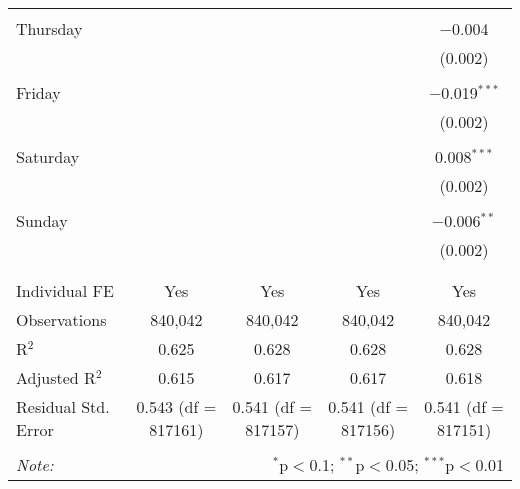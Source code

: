 \documentclass[
]{article}
\begin{document}
\begin{table}[!htbp]
{\begin{tabular}{@{\extracolsep{5pt}}lcccc}
  & & & & \\ 
 Thursday &  &  &  & $-$0.004 \\ 
  &  &  &  & (0.002) \\ 
  & & & & \\ 
 Friday &  &  &  & $-$0.019$^{***}$ \\ 
  &  &  &  & (0.002) \\ 
  & & & & \\ 
 Saturday &  &  &  & 0.008$^{***}$ \\ 
  &  &  &  & (0.002) \\ 
  & & & & \\ 
 Sunday &  &  &  & $-$0.006$^{**}$ \\ 
  &  &  &  & (0.002) \\ 
  & & & & \\ 
\hline \\[-1.8ex] 
Individual FE & Yes & Yes & Yes & Yes \\ 
Observations & 840,042 & 840,042 & 840,042 & 840,042 \\ 
R$^{2}$ & 0.625 & 0.628 & 0.628 & 0.628 \\ 
Adjusted R$^{2}$ & 0.615 & 0.617 & 0.617 & 0.618 \\ 
Residual Std. Error & 0.543 (df = 817161) & 0.541 (df = 817157) & 0.541 (df = 817156) & 0.541 (df = 817151) \\ 
\hline 
\hline \\[-1.8ex] 
\textit{Note:}  & \multicolumn{4}{r}{$^{*}$p$<$0.1; $^{**}$p$<$0.05; $^{***}$p$<$0.01} \\ 
\end{tabular}
} 
\end{table} 
\newpage
\end{document}
